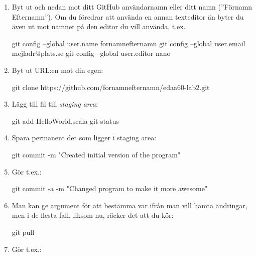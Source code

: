 \begin{enumerate}[label=C\arabic*]
	\item\label{git-config} Byt ut  och  nedan mot ditt GitHub användarnamn eller ditt namn (''Förnamn Efternamn''). Om du föredrar att använda en annan texteditor än  byter du även ut  mot namnet på den editor du vill använda, t.ex. 
	      \begin{Code}
		      git config --global user.name fornamnefternamn
		      git config --global user.email mejladr@plats.se
		      git config --global user.editor nano
	      \end{Code}

	\item\label{git-clone} Byt ut URL:en mot din egen:
	      \begin{Code}
		      git clone https://github.com/fornamnefternamn/edaa60-lab2.git
	      \end{Code}

	\item\label{git-add} Lägg till fil till \emph{staging area}:
	      \begin{Code}
		      git add HelloWorld.scala
		      git status
	      \end{Code}

	\item\label{git-commit} Spara permanent det som ligger i staging area:
	      \begin{Code}
		      git commit -m "Created initial version of the program"
	      \end{Code}

	\item\label{git-commit-a} Gör t.ex.:
	      \begin{Code}
		      git commit -a -m "Changed program to make it more awesome"
	      \end{Code}

	\item\label{git-pull-term} Man kan ge argument för att bestämma var ifrån man vill hämta ändringar, men i de flesta fall, liksom nu, räcker det att du kör:
	      \begin{Code}
		      git pull
	      \end{Code}

	\item\label{git-conflict-1} Gör t.ex.:


\end{enumerate}
